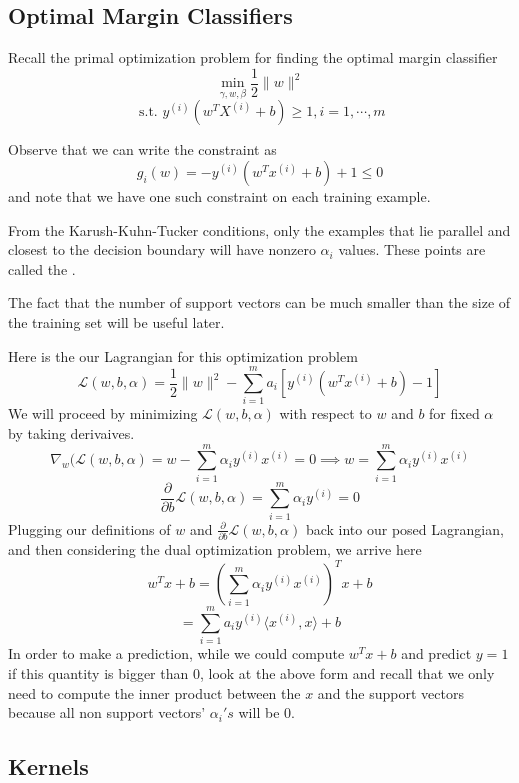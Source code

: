 \documentclass[12pt]{scrartcl}
\begin{document}
\subsection{Optimal Margin Classifiers}

Recall the primal optimization problem for finding the optimal margin classifier
\[\underset{\gamma, w, \beta}{\min}\frac{1}{2}\lVert w \rVert^2\]
\[\text{ s.t. } y^{(i)} (w^TX^{(i)} + b) \geq 1, i = 1, \cdots, m\]

Observe that we can write the constraint as 
\[g_i(w) = -y^{(i)}(w^Tx^{(i)} + b) + 1 \leq 0\]
and note that we have one such constraint on each training example. 
\begin{lemma}
    From the Karush-Kuhn-Tucker conditions, only the examples that lie parallel and closest to the decision boundary will have nonzero $\alpha_i$ values. These points are called the .
\end{lemma}

\begin{note}
    The fact that the number of support vectors can be much smaller than the size of the training set will be useful later.
\end{note}

Here is the our Lagrangian for this optimization problem
\[\mathcal{L}(w, b, \alpha) = \frac{1}{2}\lVert w \rVert^2 - \sum_{i=1}^m a_i\left[ y^{(i)} (w^Tx^{(i)} + b) - 1\right]\] 
We will proceed by minimizing $\mathcal{L}(w, b, \alpha)$ with respect to $w$ and $b$ for fixed $\alpha$ by taking derivaives.
\[\nabla_w(\mathcal{L}(w, b, \alpha) = w - \sum_{i=1}^m\alpha_iy^{(i)}x^{(i)} = 0 \implies w = \sum_{i=1}^m\alpha_iy^{(i)}x^{(i)}\]
\[\frac{\partial}{\partial b    }\mathcal{L}(w, b, \alpha) = \sum_{i=1}^m \alpha_iy^{(i)} = 0\]
Plugging our definitions of $w$ and $\frac{\partial}{\partial b}\mathcal{L}(w, b, \alpha)$ back into our posed Lagrangian, and then considering the dual optimization problem, we arrive here
\[w^Tx + b = (\sum_{i=1}^m \alpha_i y^{(i)}x^{(i)})^Tx + b\]
\[=\sum_{i=1}^ma_iy^{(i)}\langle x^{(i)}, x\rangle + b\] 
In order to make a prediction, while we could compute $w^Tx+b$ and predict $y = 1$ if this quantity is bigger than 0, look at the above form and recall that we only need to compute the inner product between the $x$ and the support vectors because all non support vectors' $\alpha_i's$ will be 0.

\subsection{Kernels}
\end{document}
